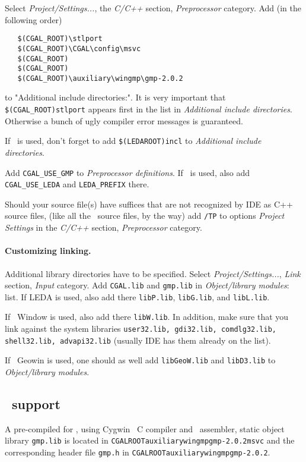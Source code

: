 Select {\em Project/Settings...}, the {\em C/C++}
section, {\em Preprocessor} category. Add (in the following order)
\begin{verbatim}
   $(CGAL_ROOT)\stlport
   $(CGAL_ROOT)\CGAL\config\msvc
   $(CGAL_ROOT)
   $(CGAL_ROOT)
   $(CGAL_ROOT)\auxiliary\wingmp\gmp-2.0.2
\end{verbatim}
to "Additional include directories:".
 It is very important that 
\texttt{\$(CGAL\_ROOT)\bslsh stlport} 
appears first in the list in {\em Additional include directories}. 
Otherwise a bunch
of ugly compiler error messages is guaranteed.

If \leda\ is used, don't forget to add 
\texttt{\$(LEDAROOT)\bslsh incl}
to {\em Additional include directories}.

Add \texttt{CGAL\_USE\_GMP} to {\em Preprocessor definitions}.
If \leda\ is used, also add \texttt{CGAL\_USE\_LEDA} and 
\texttt{LEDA\_PREFIX} there.


Should your source file(s) have suffices that are not recognized by
 IDE as C++ source files,
(like all the \cgal\ source files, by the way)
add \texttt{/TP} to options {\em Project Settings} in the {\em C/C++} section,
{\em Preprocessor} category.


\paragraph{Customizing linking.}
Additional library directories have to be specified.
Select {\em Project/Settings...}, {\em Link} section, {\em Input} 
category. Add 
\texttt{CGAL.lib} and \texttt{gmp.lib}
in {\em Object/library modules}: list.
If LEDA is used, also add there
\texttt{libP.lib},
\texttt{libG.lib}, and 
   \texttt{libL.lib}.

If \leda\ Window is used, also add there \texttt{libW.lib}.
In addition, make sure that you link against the system libraries
\texttt{user32.lib, gdi32.lib, comdlg32.lib, shell32.lib, advapi32.lib}
(usually IDE has them already on the list).

If \leda\ Geowin is used, one should as well add
\texttt{libGeoW.lib} and \texttt{libD3.lib}
to {\em Object/library modules}.


\subsection{\gmp\ support}\label{sect:wingmp}
A pre-compiled for , using Cygwin \gnu\ C compiler and 
\gnu\ assembler, 
static object library \texttt{gmp.lib} is located in 
\texttt{CGALROOT\bslsh auxiliary\bslsh wingmp\bslsh gmp-2.0.2\bslsh msvc}
and the corresponding header file \texttt{gmp.h} in
\texttt{CGALROOT\bslsh auxiliary\bslsh wingmp\bslsh gmp-2.0.2}.

